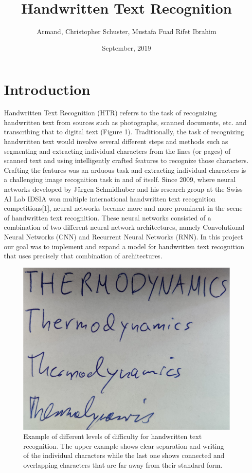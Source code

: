\documentclass{article}
\begin{document}
\title{Handwritten Text Recognition}
\date{September, 2019}
\author{Armand, Christopher Schuster, Mustafa Fuad Rifet Ibrahim}

\maketitle
\newpage
\tableofcontents

\newpage
\section{Introduction}
Handwritten Text Recognition (HTR) referrs to the task of recognizing handwritten text from sources such as photographs, scanned documents, etc. and transcribing that to digital text (Figure 1).
Traditionally, the task of recognizing handwritten text would involve several different steps and methods such as segmenting and extracting individual characters from the lines (or pages) of scanned text and using intelligently crafted features to recognize those characters. Crafting the features was an arduous task and extracting individual characters is a challenging image recognition task in and of itself. Since 2009, where neural networks developed by Jürgen Schmidhuber and his research group at the Swiss AI Lab IDSIA won multiple international handwritten text recognition competitions[1], neural networks became more and more prominent in the scene of handwritten text recognition. These neural networks consisted of a combination of two different neural network architectures, namely Convolutional Neural Networks (CNN) and Recurrent Neural Networks (RNN). In this project our goal was to implement and expand a model for handwritten text recognition that uses precisely that combination of architectures. 
\begin{figure}[h]
\begin{center}
\includegraphics[scale=0.4]{text_example2}
\end{center}
\caption{Example of different levels of difficulty for handwritten text recognition. The upper example shows clear separation and writing of the individual characters while the last one shows connected and overlapping characters that are far away from their standard form.}
\end{figure}
\end{document}
